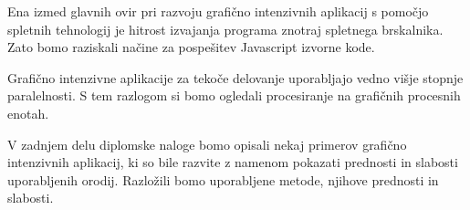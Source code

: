 Ena izmed glavnih ovir pri razvoju grafično intenzivnih aplikacij s pomočjo spletnih tehnologij je hitrost izvajanja programa znotraj spletnega brskalnika. Zato bomo raziskali načine za pospešitev Javascript izvorne kode.

Grafično intenzivne aplikacije za tekoče delovanje uporabljajo vedno višje stopnje paralelnosti. S tem razlogom si bomo ogledali procesiranje na grafičnih procesnih enotah.

V zadnjem delu diplomske naloge bomo opisali nekaj primerov grafično intenzivnih aplikacij, ki so bile razvite z namenom pokazati prednosti in slabosti uporabljenih orodij. Razložili bomo uporabljene metode, njihove prednosti in slabosti.
